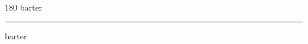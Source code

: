
\begin{frame}
\begin{center}
\begin{turn}{180}
{\fontsize{2.5cm}{1em}\selectfont barter}
\end{turn}
\vspace{1em}\par  
\hrule
\vspace{1em}\par  
{\fontsize{2.5cm}{1em}\selectfont barter}
\end{center}
\end{frame}
